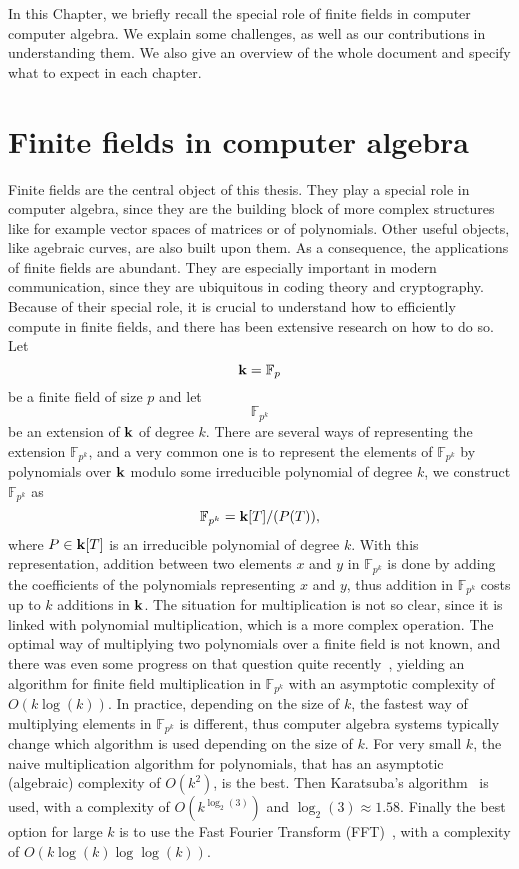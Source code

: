 In this Chapter, we briefly recall the special role of finite fields in computer
computer algebra. We explain some challenges, as well as our contributions in
understanding them. We also give an overview of the whole document and specify
what to expect in each chapter.
\minitoc
\clearpage

\section{Finite fields in computer algebra}

Finite fields are the central object of this thesis. They play a special role in
computer algebra, since they are the building block of more complex structures
like for example vector spaces of matrices or of polynomials. Other useful
objects, like agebraic curves, are also built upon them. As a consequence, the
applications of finite fields are abundant. They are especially important in
modern communication, since they are ubiquitous in coding theory and
cryptography. Because of their special role, it is crucial to
understand how to efficiently compute in finite fields, and there has been
extensive research on how to do so. Let 
\[
  \mathbf{k} = \mathbb{F}_{p}
\]
be a finite field of size $p$ and let 
\[
  \mathbb{F}_{p^k}
\]
be an extension of $\mathbf{k}$ of degree $k$. There are several ways of representing
the extension $\mathbb{F}_{p^{k}}$, and a very common one is to represent the
elements of $\mathbb{F}_{p^{k}}$ by polynomials over $\mathbf{k}$ modulo some
irreducible polynomial of degree $k$, \ie we construct $\mathbb{F}_{p^{k}}$ as
\[
  \mathbb{F}_{p^{k}} = \mathbf{k}[T]/(P(T)),
\]
where $P\in\mathbf{k}[T]$ is an irreducible polynomial of degree $k$. With this
representation, addition between two elements $x$ and $y$ in
$\mathbb{F}_{p^{k}}$ is done by adding the coefficients of the polynomials
representing $x$ and $y$, thus addition in $\mathbb{F}_{p^{k}}$ costs up to $k$
additions in $\mathbf{k}$. The situation for multiplication is not so clear, since it is
linked with polynomial multiplication, which is a more complex operation. The
optimal way of multiplying two polynomials over a finite field is not known, and
there was even some progress on that question quite recently~\cite{HVDH19ff},
yielding an algorithm for finite field multiplication in
$\mathbb{F}_{p^{k}}$ with an asymptotic complexity of $O(k\log(k))$.
In practice, depending on the size of $k$, the fastest way of multiplying
elements in
$\mathbb{F}_{p^k}$ is different, thus computer algebra systems typically change
which algorithm is used depending on the size of $k$. For very small $k$, the
naive multiplication algorithm for polynomials, that has an asymptotic
(algebraic) complexity of $O(k^2)$, is the best. Then Karatsuba's
algorithm~\cite{Karatsuba63} is used, with a complexity of $O(k^{\log_2(3)})$
and $\log_2(3)\approx1.58$. Finally the best option for
large $k$ is to use the Fast Fourier Transform (FFT)~\cite{CT65, SS71}, with a
complexity of $O(k\log(k)\log\log(k))$.

